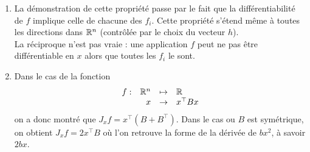 \remarks
\begin{enumerate}
  \item La démonstration de cette propriété passe par le fait que la différentiabilité de $f$ implique celle de chacune des $f_i$. Cette propriété s'étend même à toutes les directions dans $\mathbb{R}^n$ (contrôlée par le choix du vecteur $h$). \\
  La réciproque n'est pas vraie : une application $f$ peut ne pas être différentiable en $x$ alors que toutes les $f_i$ le sont.
  \item Dans le cas de la fonction
  $$
  \begin{array}{rrcl}
    f : & \mathbb{R}^n & \mapsto & \mathbb{R} \\
    & x & \to & x^\top B x
  \end{array}
  $$
  on a donc montré que $J_x f = x^\top (B + B^\top)$. Dans le cas ou $B$ est symétrique, on obtient $J_x f = 2 x^\top B$ où l'on retrouve la forme de la dérivée de $bx^2$, à savoir $2 bx$.

\end{enumerate}


